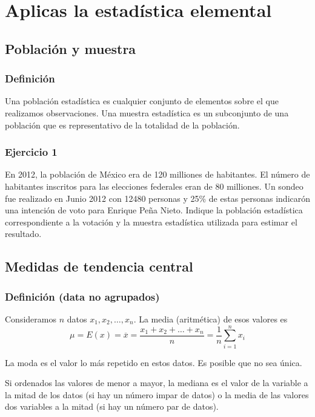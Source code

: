 \chapter{Aplicas la estadística elemental}

\section{Población y muestra}

\subsection{Definición}

Una población estadística es cualquier conjunto de elementos sobre el que
realizamos observaciones. Una muestra estadística es un subconjunto de una
población que es representativo de la totalidad de la población.

\subsection{Ejercicio 1}

En 2012, la población de México era de 120 milliones de habitantes. El número
de habitantes inscritos para las elecciones federales eran de 80 milliones.
Un sondeo fue realizado en Junio 2012 con 12480 personas y 25\% de estas
personas indicarón una intención de voto para Enrique Peña Nieto.
Indique la población estadística correspondiente a la votación y la muestra
estadística utilizada para estimar el resultado.

\section{Medidas de tendencia central}

\subsection{Definición (data no agrupados)}

Consideramos $n$ datos $x_1, x_2, \ldots, x_n$. La media (aritmética) de esos
valores es
$$\mu = E(x) =
\overline{x} = \frac{x_1 + x_2 + \ldots + x_n}{n} = \frac{1}{n}\sum_{i=1}^n x_i$$

La moda es el valor lo más repetido en estos datos. Es posible que no sea
única.

Si ordenados las valores
de menor a mayor, la mediana es el valor de la variable a la mitad de los datos
(si hay un número impar de datos)
o la media de las valores dos variables a la mitad (si hay un número par de
datos).


